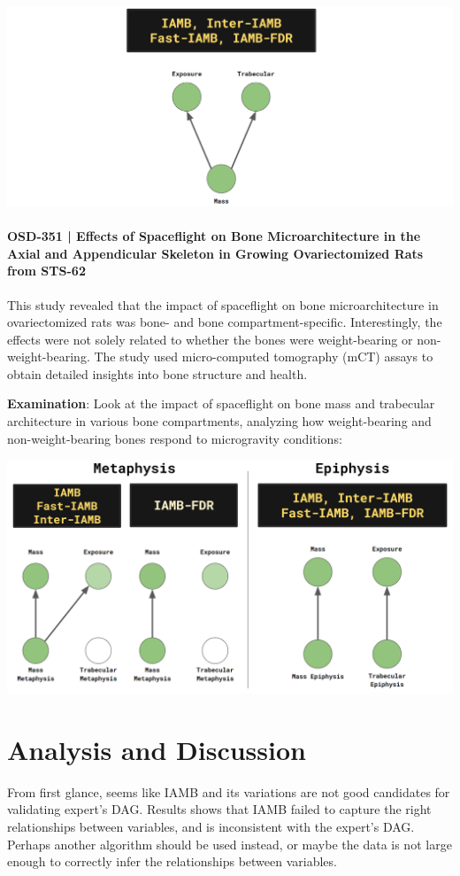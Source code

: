 \documentclass{article}
\begin{document}
\includegraphics[width=\textwidth,height=\textheight,keepaspectratio]{OSD-489.png}


\paragraph{OSD-351 | Effects of Spaceflight on Bone Microarchitecture in the Axial and Appendicular Skeleton in Growing Ovariectomized Rats from STS-62}
This study revealed that the impact of spaceflight on bone microarchitecture in ovariectomized rats was bone- and bone compartment-specific. Interestingly, the effects were not solely related to whether the bones were weight-bearing or non-weight-bearing. The study used micro-computed tomography (mCT) assays to obtain detailed insights into bone structure and health.

\quad\quad\textbf{Examination}:  Look at the impact of spaceflight on bone mass and trabecular architecture in various bone compartments, analyzing how weight-bearing and non-weight-bearing bones respond to microgravity conditions:

\includegraphics[width=\textwidth,height=\textheight,keepaspectratio]{OSD-351.png}



\section{Analysis and Discussion}
From first glance, seems like IAMB and its variations are not good candidates for validating expert's DAG.
Results shows that IAMB failed to capture the right relationships between variables, and is inconsistent with the expert's DAG.
Perhaps another algorithm should be used instead, or maybe the data is not large enough to correctly infer the relationships between variables. 
\end{document}
